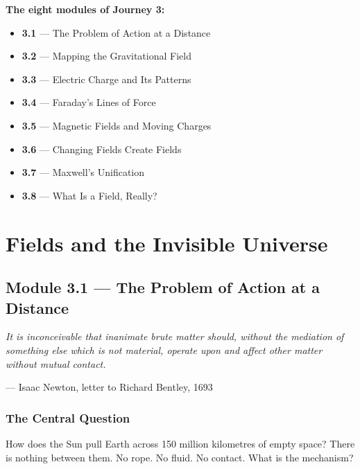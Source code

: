 \documentclass[12pt, a4paper, twoside]{book}
\theoremstyle{disc}
\begin{document}
\vspace{0.4cm}
\textbf{The eight modules of Journey 3:}
\begin{itemize}[leftmargin=2em,itemsep=2pt]
  \item \textbf{3.1} --- The Problem of Action at a Distance
  \item \textbf{3.2} --- Mapping the Gravitational Field
  \item \textbf{3.3} --- Electric Charge and Its Patterns
  \item \textbf{3.4} --- Faraday's Lines of Force
  \item \textbf{3.5} --- Magnetic Fields and Moving Charges
  \item \textbf{3.6} --- Changing Fields Create Fields
  \item \textbf{3.7} --- Maxwell's Unification
  \item \textbf{3.8} --- What Is a Field, Really?
\end{itemize}

\tableofcontents

\chapter{Fields and the Invisible Universe}

\section{Module 3.1 — The Problem of Action at a Distance}
\label{sec:action_distance}

\epigraph{\itshape
  It is inconceivable that inanimate brute matter should, without the mediation
  of something else which is not material, operate upon and affect other matter
  without mutual contact.
}{--- Isaac Newton, letter to Richard Bentley, 1693}

\subsection{The Central Question}

\begin{puzzlebox}
How does the Sun pull Earth across 150 million kilometres of empty space? There is nothing between them. No rope. No fluid. No contact. What is the mechanism?
\end{puzzlebox}
\end{document}
